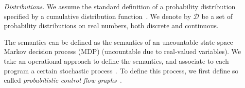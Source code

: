 \emph{Distributions.} We assume the standard definition of a probability 
distribution specified by a cumulative distribution 
function~\cite{Billingsley:book}. We denote by $\mathcal{D}$ be a set of 
probability distributions on 
real numbers, both discrete and continuous.

\smallskip{}
The semantics can be defined as the semantics of an uncountable state-space
Markov decision process (MDP) (uncountable due to real-valued variables).
We take an operational approach to define the semantics, and associate to each program 
a certain stochastic process~\cite{SriramCAV,HolgerPOPL,Kozen:prob-semantics}.
To define this process, we first define so called 
\emph{probabilistic control flow graphs}~\cite{CFG16:positivstellensatz-arxiv}.

